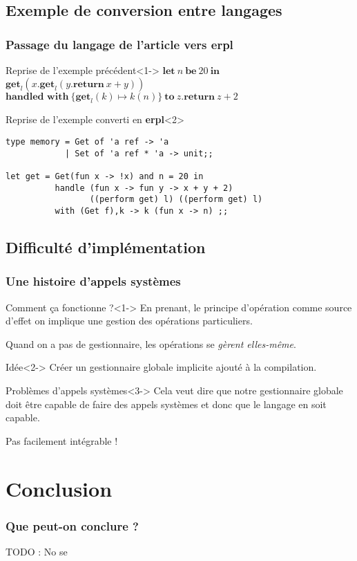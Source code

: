 \documentclass{beamer}
\begin{document}
\subsection{Exemple de conversion entre langages}
\begin{frame}[fragile]
	\frametitle{Passage du langage de l'article vers \textbf{erpl}}

	\begin{exampleblock}{Reprise de l'exemple précédent}<1->
		$\textbf{let}~n~\textbf{be}~20~\textbf{in}$\\
		$\textbf{get}_l(x.\textbf{get}_l(y.\textbf{return}~x+y))$\\
		$\textbf{handled~with}~\{\textbf{get}_{l}(k) \mapsto k(n)\}~\textbf{to}~z.\textbf{return}~z+2$
	\end{exampleblock}

	\begin{exampleblock}{Reprise de l'exemple converti en \textbf{erpl}}<2>

		\begin{lstlisting}[language=caml]
type memory = Get of 'a ref -> 'a 
            | Set of 'a ref * 'a -> unit;;

let get = Get(fun x -> !x) and n = 20 in
          handle (fun x -> fun y -> x + y + 2) 
                 ((perform get) l) ((perform get) l) 
          with (Get f),k -> k (fun x -> n) ;;
		\end{lstlisting}
	\end{exampleblock}
\end{frame}

\subsection{Difficulté d'implémentation}
\begin{frame}
	\frametitle{Une histoire d'appels systèmes}
	\begin{block}{Comment ça fonctionne ?}<1->
		En prenant, le principe d'opération comme source d'effet on implique une gestion des opérations particuliers.

		Quand on a pas de gestionnaire, les opérations se \textit{gèrent elles-même}.
	\end{block}

	\begin{block}{Idée}<2->
		Créer un gestionnaire globale implicite ajouté à la compilation. 
	\end{block}

	\begin{alertblock}{Problèmes d'appels systèmes}<3->
		Cela veut dire que notre
		gestionnaire globale doit être capable de faire des appels systèmes et donc que le langage en soit capable.

		\alert{Pas facilement intégrable !}
	\end{alertblock}
\end{frame}

\section{Conclusion}
\begin{frame}
	\frametitle{Que peut-on conclure ?}
	TODO : No se

	
\end{frame}
\end{document}
